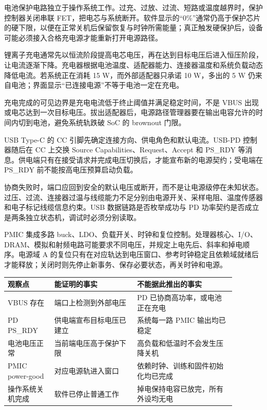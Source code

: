 电池保护电路独立于操作系统工作。过充、过放、过流、短路或温度越界时，保护控制器关闭串联 FET，把电芯与系统断开。软件显示的“0\%”通常仍高于保护芯片的硬下限，以便在正常关机后保留恢复与时钟所需能量；真正触发硬保护后，设备可能必须接入合格充电源才能重新打开电源路径。


锂离子充电通常先以恒流阶段提高电芯电压，再在达到目标电压后进入恒压阶段，让电流逐渐下降。充电器根据电池温度、适配器能力、连接器温度和系统负载动态降低电流。若系统正在消耗 15 W，而外部适配器只承诺 10 W，多出的 5 W 仍来自电池；界面显示“已连接电源”不等于电池一定在充电。

充电完成的可见边界是充电电流低于终止阈值并满足稳定时间，不是 VBUS 出现或电芯达到一次目标电压。拔出适配器后，电源路径管理器要在输出电容允许的时间内切到电池，避免系统轨跌破 SoC 的 brownout 门限。


USB Type-C 的 CC 引脚先确定连接方向、供电角色和默认电流。USB-PD 控制器随后在 CC 上交换 Source Capabilities、Request、Accept 和 PS\_RDY 等消息。供电端只有在接受请求并完成电压切换后，才能宣布新的电源契约；受电端在 PS\_RDY 前不能按高电压预算启动负载。

协商失败时，端口应回到安全的默认电压或断开，而不是让电源级停在未知状态。过压、过流、连接器过温与线缆能力不足分别由电源开关、采样电阻、温度传感器和电子标记线缆信息约束。USB 数据链路是否枚举成功与 PD 功率契约是否成立是两条独立状态机，调试时必须分别读取。


PMIC 集成多路 buck、LDO、负载开关、时钟和复位控制。处理器核心、I/O、DRAM、模拟和射频电路可能要求不同电压，并规定上电先后、斜率和掉电顺序。电源域 A 的复位只有在对应轨达到电压窗口、参考时钟稳定且依赖域就绪后才能释放；关闭时则先停止新事务、保存必要状态，再关时钟和电源。

\begin{longtable}{L{0.18\linewidth}L{0.32\linewidth}L{0.38\linewidth}}
\toprule
观察点 & 能证明的事实 & 不能据此推出的事实 \\
\midrule
VBUS 存在 & 端口上检测到外部电压 & PD 已协商高功率，或电池正在充电 \\\tablerowrule
PD PS\_RDY & 供电端宣布目标电压已建立 & 系统每一路 PMIC 输出均已稳定 \\\tablerowrule
电池电压正常 & 当前端电压高于保护下限 & 高负载和低温时不会发生压降关机 \\\tablerowrule
PMIC power-good & 对应电源轨进入窗口 & 依赖时钟、训练和固件初始化均已完成 \\\tablerowrule
操作系统关机完成 & 软件已停止普通工作 & 掉电保持电容已放完，所有外设均无电 \\
\bottomrule
\end{longtable}


